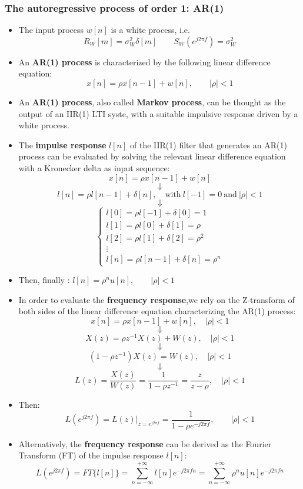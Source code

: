 \subsubsection{The autoregressive process of order 1: AR(1)}
\begin{itemize}
    \item The input process \(w[n]\) is a white process, i.e.
    \[
    R_W[m]=\sigma_W^2\delta[m]\qquad S_W(e^{j2\pi f})=\sigma_W^2
    \]
    \item An \textbf{AR(1) process} is characterized by the following linear difference equation:
    \[
    x[n]=\rho x[n-1]+w[n],\qquad |\rho|<1
    \]
    \item An \textbf{AR(1) process}, also called \textbf{Markov process}, can be thought as the output of an IIR(1) LTI syste, with a suitable impulsive response driven by a white process.
    \item The \textbf{impulse response} \(l[n]\) of the IIR(1) filter that generates an AR(1) process can be evaluated by solving the relevant linear difference equation with a Kronecker delta as input sequence:    \[
x[n] = \rho x[n-1] + w[n]
\]
\[
\Downarrow
\]
\[
l[n] = \rho l[n-1] + \delta[n], \quad \text{with} \ l[-1]=0\ \text{and}\ |\rho| < 1
\]
\[
\Downarrow
\]
\[
\left\{
\begin{array}{l}
l[0] = \rho l[-1] + \delta[0] = 1 \\
l[1] = \rho l[0] + \delta[1] = \rho \\
l[2] = \rho l[1] + \delta[2] = \rho^2 \\
\vdots \\
l[n] = \rho l[n-1] + \delta[n] = \rho^n
\end{array}
\right.
\]
    \item Then, finally : \(l[n]=\rho^nu[n],\qquad|\rho|<1\)
    \item In order to evaluate the \textbf{frequency response},we rely on the Z-transform of both sides of the linear difference equation characterizing the AR(1) process:
\[
x[n] = \rho x[n-1] + w[n], \quad |\rho| < 1
\]
\[
\Downarrow
\]
\[
X(z) = \rho z^{-1} X(z) + W(z), \quad |\rho| < 1
\]
\[
\Downarrow
\]
\[
\left(1 - \rho z^{-1}\right) X(z) = W(z), \quad |\rho| < 1
\]
\[
\Downarrow
\]
\[
L(z) = \frac{X(z)}{W(z)} = \frac{1}{1 - \rho z^{-1}} = \frac{z}{z-\rho}, \quad |\rho| < 1
\]
    \item Then: \[L(e^{j2\pi f})=L(z)\Big|_{z=e^{j2\pi f}}=\frac{1}{1-\rho e^{-j2\pi f}},\qquad|\rho|<1\]
    \item Alternatively, the \textbf{frequency response} can be derived as the Fourier Transform (FT) of the impulse response \(l[n]\):
    \[
L\left(e^{j2\pi f}\right) = FT\{l[n]\} = \sum_{n=-\infty}^{+\infty} l[n] e^{-j2\pi f n} = \sum_{n=-\infty}^{+\infty} \rho^n u[n] e^{-j2\pi f n}
\]


\end{itemize}
